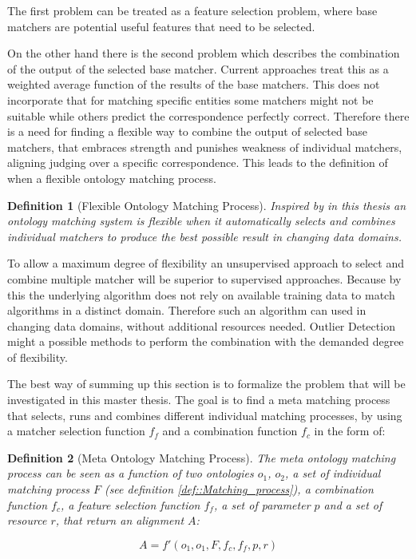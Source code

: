 \documentclass[11pt,titlepage,oneside,openany,a4paper]{report}
\newtheorem{definition}{Definition}[chapter]
\begin{document}
The first problem can be treated as a feature selection problem, where base matchers are potential useful features that need to be selected. 

On the other hand there is the second problem which describes the combination of the output of the selected base matcher. Current approaches treat this as a weighted average function of the results of the base matchers. This does not incorporate that for matching specific entities some matchers might not be suitable while others predict the correspondence perfectly correct. Therefore there is a need for finding a flexible way to combine the output of selected base matchers, that embraces strength and punishes weakness of individual matchers, aligning judging over a specific correspondence. This leads to the definition of when a flexible ontology matching process.

\begin{definition}[Flexible Ontology  Matching Process]
Inspired by \cite{Ngo:2012aa} in this thesis an ontology matching system is flexible when it automatically selects and combines individual matchers to produce the best possible result in changing data domains.
\end{definition}

To allow a maximum degree of flexibility an unsupervised approach to select and combine multiple matcher will be superior to supervised approaches. Because by this the underlying algorithm does not rely on available training data to match algorithms in a distinct domain. Therefore such an algorithm can used in changing data domains, without additional resources needed. Outlier Detection might a possible methods to perform the combination with the demanded degree of flexibility. 

The best way of summing up this section is to formalize the problem that will be investigated in this master thesis. The goal is to find a meta matching process that selects, runs and combines different individual matching processes, by using a matcher selection function $f_f$ and a combination function $f_c$ in the form of:
\begin{definition}[Meta Ontology Matching Process]
The meta ontology matching process can be seen as a function  of two ontologies $o_1$, $o_2$, a set of individual matching process $F$ (see definition \ref{def::Matching_process}), a combination function $f_c$, a feature selection function $f_f$, a set of parameter $p$ and a set of resource $r$, that return an alignment $A$:

\begin{equation*}
A = f' (o_1,o_1,F, f_c,f_f, p,r)
\end{equation*}
\end{definition}
\end{document}
